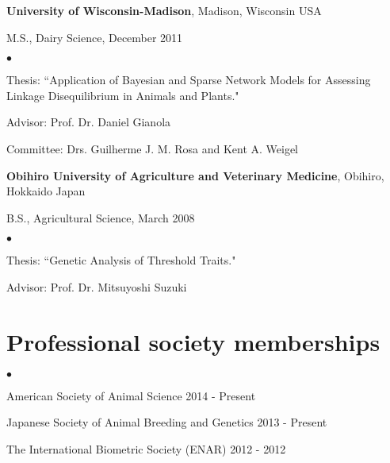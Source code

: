\documentclass[margin,line,10pt]{res}
\newenvironment{list1}{
  \begin{list}{\ding{113}}{%
      \setlength{\itemsep}{0in}
      \setlength{\parsep}{0in} \setlength{\parskip}{0in}
      \setlength{\topsep}{0in} \setlength{\partopsep}{0in} 
      \setlength{\leftmargin}{0.17in}}}{\end{list}}
\newenvironment{list2}{
  \begin{list}{$\bullet$}{%
      \setlength{\itemsep}{0in}
      \setlength{\parsep}{0in} \setlength{\parskip}{0in}
      \setlength{\topsep}{0in} \setlength{\partopsep}{0in} 
      \setlength{\leftmargin}{0.2in}}}{\end{list}}
\begin{document}
\begin{resume}
{\bf University of Wisconsin-Madison}, Madison, Wisconsin USA\\
\vspace*{-.1in}
\begin{list1}
\item[] M.S., Dairy Science, December 2011
\begin{list2}
\vspace*{.05in}
\item Thesis: ``Application of Bayesian and Sparse Network Models for Assessing Linkage Disequilibrium in Animals and Plants." 
\item Advisor: Prof. Dr. Daniel Gianola 
\item Committee: Drs. Guilherme J. M. Rosa and Kent A. Weigel
\end{list2}
\vspace*{.05in}
\end{list1}


{\bf Obihiro University of Agriculture and Veterinary Medicine}, Obihiro, Hokkaido Japan\\
\vspace*{-.1in}
\begin{list1}
\item[] B.S., Agricultural Science,  March 2008
\begin{list2}
\vspace*{.05in}
\item Thesis:  ``Genetic Analysis of Threshold Traits." 
\item Advisor: Prof. Dr. Mitsuyoshi Suzuki
\end{list2}
\end{list1}









\vspace{0.5cm}
\section{\sc Professional society memberships}
\begin{list2}
\item American Society of Animal Science 2014 - Present
\vspace{0.3cm}
\item Japanese Society of Animal Breeding and Genetics 2013 - Present 
\vspace{0.3cm}
\item The International Biometric Society (ENAR) 2012 - 2012
\end{list2}




\end{resume}
\end{document}
